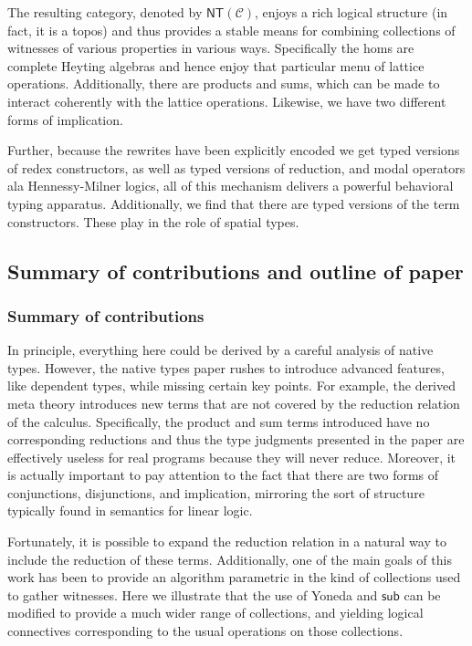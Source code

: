 The resulting category, denoted by $\mathsf{NT}(\mathcal{C})$, enjoys
a rich logical structure (in fact, it is a topos) and thus provides a
stable means for combining collections of witnesses of various
properties in various ways. Specifically the homs are complete Heyting
algebras and hence enjoy that particular menu of lattice
operations. Additionally, there are products and sums, which can be
made to interact coherently with the lattice operations. Likewise, we
have two different forms of implication.

Further, because the rewrites have been explicitly encoded we get
typed versions of redex constructors, as well as typed versions of
reduction, and modal operators ala Hennessy-Milner logics, all of this
mechanism delivers a powerful behavioral typing
apparatus. Additionally, we find that there are typed versions of the
term constructors. These play in the role of spatial types. 

\subsection{Summary of contributions and outline of paper}

\subsubsection{Summary of contributions}
In principle, everything here could be derived by a careful analysis
of native types. However, the native types paper rushes to introduce
advanced features, like dependent types, while missing certain key
points. For example, the derived meta theory introduces new terms that
are not covered by the reduction relation of the
calculus. Specifically, the product and sum terms introduced have no
corresponding reductions and thus the type judgments presented in the
paper are effectively useless for real programs because they will
never reduce. Moreover, it is actually important to pay attention to
the fact that there are two forms of conjunctions, disjunctions, and
implication, mirroring the sort of structure typically found in
semantics for linear logic.

Fortunately, it is possible to expand the reduction relation in a
natural way to include the reduction of these terms. Additionally, one
of the main goals of this work has been to provide an algorithm
parametric in the kind of collections used to gather witnesses. Here
we illustrate that the use of Yoneda and $\mathsf{sub}$ can be
modified to provide a much wider range of collections, and yielding
logical connectives corresponding to the usual operations on those
collections.

